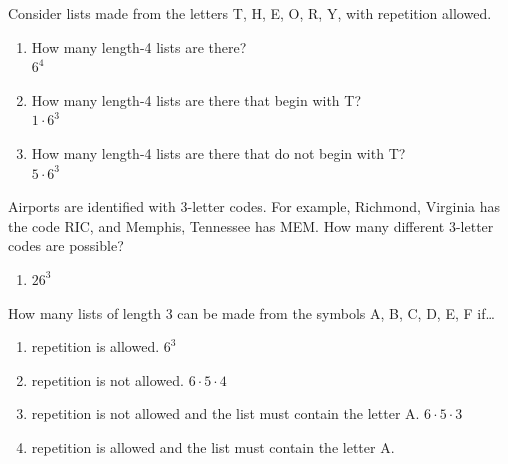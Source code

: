 \documentclass[openany, 12pt]{book}
\begin{document}
\begin{exercise}{}{}
	Consider lists made from the letters T, H, E, O, R, Y,
	with repetition allowed.
	\begin{enumerate}[label = {(\arabic*)}]
		\item How many length-4 lists are there? \\
		      $6^4$
		\item How many length-4 lists are there that begin with T?\\
		      $1 \cdot 6^3$
		\item How many length-4 lists are there that do not begin with T?\\
		      $5 \cdot 6^3$
	\end{enumerate}
\end{exercise}

\begin{exercise}{}{}
	Airports are identified with 3-letter codes. For example,
	Richmond, Virginia has the code RIC, and Memphis, Tennessee has MEM. How
	many different 3-letter codes are possible?
	\begin{enumerate}[label = {(\arabic*)}]
		\item $26^3$
	\end{enumerate}
\end{exercise}

\begin{exercise}{}{}
	How many lists of length 3 can be made from the symbols A,
	B, C, D, E, F if\ldots
	\begin{enumerate}[label = {(\arabic*)}]
		\item repetition is allowed.
		      $ 6^3$
		\item repetition is not allowed.
		      $ 6\cdot 5 \cdot 4$
		\item repetition is not allowed and the list must contain the letter A.
		      $ 6\cdot 5 \cdot 3$
		\item repetition is allowed and the list must contain the letter A.
	\end{enumerate}
\end{exercise}
\end{document}
